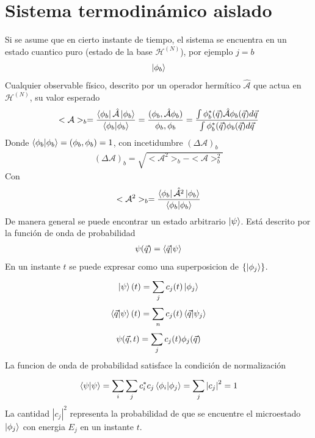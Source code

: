 \documentclass{article}
\begin{document}
\section{Sistema termodinámico aislado }
Si se asume que en cierto instante de tiempo, el sistema se encuentra en un estado cuantico puro (estado de la base $ \mathcal H ^ {(N) } $), por ejemplo $ j=b  $
\begin{gather*}
  \ket{\phi_b } 
\end{gather*}
Cualquier observable físico, descrito por un operador hermítico $ \hat{\mathcal A } $ que actua en $ \mathcal H ^ {(N) } $, su valor esperado 
\begin{gather*}
  <\mathcal A >_b = \frac{\bra{\phi_b }\hat{\mathcal A }\ket{\phi_b } }{\bra{\phi_b }\ket{\phi_b }} = \frac{(\phi_b,\hat{\mathcal A } \phi_b  )}{\phi_b,\phi_b} = \frac{\int \phi_b^*(\vec q)\hat{\mathcal A }\phi_b(\vec q ) d\vec q }{\int \phi_b^*(\vec q)\phi_b(\vec q ) d\vec q} 
\end{gather*}
Donde $ \bra{\phi_b }\ket{\phi_b } = (\phi_b , \phi_b )  = 1 $, con incetidumbre $ (\Delta \mathcal A )_b  $
\begin{gather*}
   (\Delta \mathcal A )_b = \sqrt{<\mathcal A^2>_b - <\mathcal A >_b^2 } 
\end{gather*}
Con 
\begin{gather*}
  <\mathcal A^2 >_b = \frac{\bra{\phi_b }\hat{\mathcal A^2 }\ket{\phi_b } }{\bra{\phi_b }\ket{\phi_b }} 
\end{gather*}
De manera general se puede encontrar un estado arbitrario $ \ket{\psi } $. Está descrito por la función de onda de probabilidad 
\begin{gather*}
  \psi(\vec q ) = \bra{\vec q }\ket{\psi} 
\end{gather*}
En un instante $ t  $ se puede expresar como una superposicion de $ \{\ket{\phi_j  }\} $.
\begin{gather*}
  \ket{\psi }(t) = \displaystyle\sum_{j }^{} c_j(t) \ket{\phi_j }\\
  \bra{\vec q }\ket{\psi}(t) = \displaystyle\sum_{n }^{}c_j(t) \bra{\vec q }\ket{\psi_j }\\
  \psi(\vec q, t ) = \displaystyle\sum_{j }^{} c_j (t) \phi_j(\vec q )
\end{gather*}
La funcion de onda de probabilidad satisface la condición de normalización 
\begin{gather*}
  \bra{\psi }\ket{\psi} = \displaystyle\sum_{i }^{} \displaystyle\sum_{j }^{} c_i^* c_j \bra{\phi_i }\ket{\phi_j } = \displaystyle\sum_{j }^{} \left|c_j \right|^2 = 1   
\end{gather*}
La cantidad $ \left|c_j \right|^2 $ representa la probabilidad de que se encuentre el microestado $ \ket{\phi_j } $ con energia $ E_j  $ en un instante $ t  $.
\end{document}
